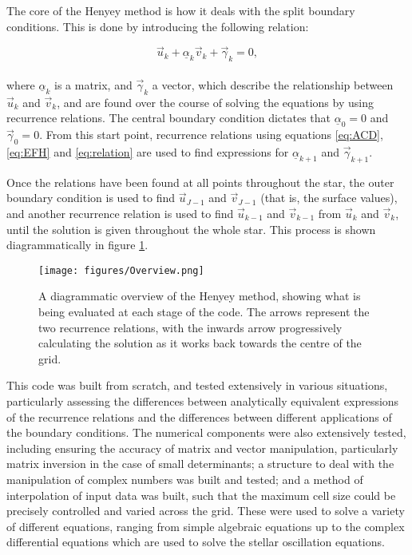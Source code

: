 \documentclass[11pt]{amsart}
\begin{document}
The core of the Henyey method is how it deals with the split boundary conditions.  This is done by introducing the following relation:

\begin{equation} \label{eq:relation}
\vec{u}_{k}  + \underline{\alpha}_{k}  \vec{v}_{k}  + \vec{\gamma}_{k}  = 0,
\end{equation}
\\
where $\underline{\alpha}_{k}$ is a matrix, and $\vec{\gamma}_{k}$ a vector, which describe the relationship between $\vec{u}_{k}$ and $\vec{v}_{k}$, and are found over the course of solving the equations by using recurrence relations.  The central boundary condition dictates that $\underline{\alpha}_{0} = 0$ and $\vec{\gamma}_{0} = 0$.  From this start point, recurrence relations using equations \ref{eq:ACD}, \ref{eq:EFH} and \ref{eq:relation} are used to find expressions for $\underline{\alpha}_{k+1}$ and $\vec{\gamma}_{k+1}$.

Once the relations have been found at all points throughout the star, the outer boundary condition is used to find $\vec{u}_{J-1}$ and $\vec{v}_{J-1}$ (that is, the surface values), and another recurrence relation is used to find $\vec{u}_{k-1}$ and $\vec{v}_{k-1}$ from $\vec{u}_{k}$ and $\vec{v}_{k}$, until the solution is given throughout the whole star.  This process is shown diagrammatically in figure \ref{fig:overview}.









\begin{figure}
\begin{center}
\texttt{[image: figures/Overview.png]}
\caption{A diagrammatic overview of the Henyey method, showing what is being evaluated at each stage of the code.  The arrows represent the two recurrence relations, with the inwards arrow progressively calculating the solution as it works back towards the centre of the grid.}
\label{fig:overview}
\end{center}
\end{figure}


This code was built from scratch, and tested extensively in various situations, particularly assessing the differences between analytically equivalent expressions of the recurrence relations and the differences between different applications of the boundary conditions.  The numerical components were also extensively tested, including ensuring the accuracy of matrix and vector manipulation, particularly matrix inversion in the case of small determinants; a structure to deal with the manipulation of complex numbers was built and tested; and a method of interpolation of input data was built, such that the maximum cell size could be precisely controlled and varied across the grid.  These were used to solve a variety of different equations, ranging from simple algebraic equations up to the complex differential equations which are used to solve the stellar oscillation equations.
\end{document}
